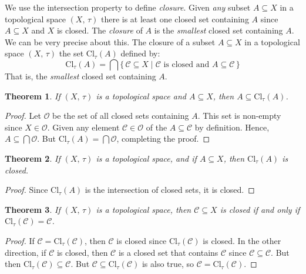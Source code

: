 \documentclass{article}
\theoremstyle{plain}
\newtheorem{theorem}{Theorem}[section]
\theoremstyle{normal}
\newenvironment{definition}{%
    \pushQED{\qed}\renewcommand{\qedsymbol}{$\blacksquare$}\definitionx%
}{%
    \popQED\enddefinitionx%
}
\begin{document}
        We use the intersection property to define \textit{closure}. Given
        \textit{any} subset $A\subseteq{X}$ in a topological space $(X,\,\tau)$
        there is at least one closed set containing $A$ since
        $A\subseteq{X}$ and $X$ is closed. The \textit{closure} of $A$ is the
        \textit{smallest} closed set containing $A$. We can be very precise
        about this.
        \begin{definition}[\textbf{Closure of a Set}]
            The closure of a subset $A\subseteq{X}$ in a topological space
            $(X,\,\tau)$ the set $\textrm{Cl}_{\tau}(A)$ defined by:
            \begin{equation}
                \textrm{Cl}_{\tau}(A)=\bigcap\{\,\mathcal{C}\subseteq{X}\;|\;
                    \mathcal{C}\textrm{ is closed and }A\subseteq\mathcal{C}\,\}
            \end{equation}
            That is, the \textit{smallest} closed set containing $A$.
        \end{definition}
        \begin{theorem}
            If $(X,\,\tau)$ is a topological space and $A\subseteq{X}$, then
            $A\subseteq\textrm{Cl}_{\tau}(A)$.
        \end{theorem}
        \begin{proof}
            Let $\mathcal{O}$ be the set of all closed sets containing $A$.
            This set is non-empty since $X\in\mathcal{O}$. Given any element
            $\mathcal{C}\in\mathcal{O}$ of the $A\subseteq\mathcal{C}$ by
            definition. Hence, $A\subseteq\bigcap\mathcal{O}$. But
            $\textrm{Cl}_{\tau}(A)=\bigcap\mathcal{O}$, completing the proof.
        \end{proof}
        \begin{theorem}
            If $(X,\,\tau)$ is a topological space, and if $A\subseteq{X}$,
            then $\textrm{Cl}_{\tau}(A)$ is closed.
        \end{theorem}
        \begin{proof}
            Since $\textrm{Cl}_{\tau}(A)$ is the intersection of closed sets,
            it is closed.
        \end{proof}
        \begin{theorem}
            If $(X,\,\tau)$ is a topological space, then
            $\mathcal{C}\subseteq{X}$ is closed if and only if
            $\textrm{Cl}_{\tau}(\mathcal{C})=\mathcal{C}$.
        \end{theorem}
        \begin{proof}
            If $\mathcal{C}=\textrm{Cl}_{\tau}(\mathcal{C})$, then
            $\mathcal{C}$ is closed since $\textrm{Cl}_{\tau}(\mathcal{C})$ is
            closed. In the other direction, if
            $\mathcal{C}$ is closed, then $\mathcal{C}$ is a closed set that
            contains $\mathcal{C}$ since $\mathcal{C}\subseteq\mathcal{C}$. But
            then $\textrm{Cl}_{\tau}(\mathcal{C})\subseteq\mathcal{C}$. But
            $\mathcal{C}\subseteq\textrm{Cl}_{\tau}(\mathcal{C})$ is also true,
            so $\mathcal{C}=\textrm{Cl}_{\tau}(\mathcal{C})$.
        \end{proof}
\end{document}
